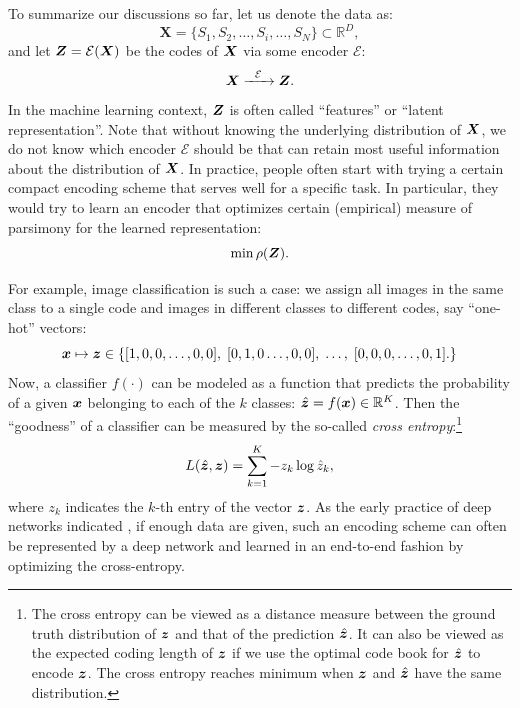 \documentclass[../../book-main.tex]{subfiles}
\begin{document}
\label{sec:consistency}
To summarize our discussions so far, let us denote the data as:
\begin{equation}
    \boldsymbol{X} = \{S_1, S_2, \ldots, S_i, \ldots, S_N\} \subset \mathbb{R}^D,
\end{equation}
and let $\boldsymbol{Z} = \mathcal{E}(\bm{X})$ be the codes of $\bm{X}$ via some encoder $\mathcal{E}$:
\begin{equation}
    \bm{X}  \xrightarrow{\hspace{2mm} \mathcal{E}\hspace{2mm}} \bm{Z}.
    \label{eqn:open-loop}
\end{equation}
In the machine learning context, $\bm{Z}$ is often called ``features'' or ``latent representation''. Note that without knowing the underlying distribution of $\bm{X}$, we do not know which encoder $\mathcal{E}$ should be that can retain most useful information about the distribution of $\bm{X}$. In practice, people often start with trying a certain compact encoding scheme that serves well for a specific task. In particular, they would try to learn an encoder that optimizes certain (empirical) measure of parsimony for the learned representation:
\begin{equation}
    \min \rho(\bm{Z}). 
\end{equation}

\begin{example}
For example, image classification is such a case: we assign all images in the same class to a single code and images in different classes to different codes, say ``one-hot'' vectors:
\begin{equation}
  \bm{x} \mapsto \bm{z} \in \{  [1, 0, 0, \ldots , 0, 0], \;  [0, 1, 0 \ldots, 0, 0], \; \ldots, \;  [0,0,0, \ldots, 0, 1].\}
  \label{eqn:class-labels}
\end{equation}
Now, a classifier $f(\cdot)$ can be modeled as a function that predicts the probability of a given $\bm{x}$ belonging to each of the $k$ classes: $\hat{\bm{z}} = f(\bm{x}) \in \mathbb{R}^K$. Then the ``goodness'' of a classifier can be measured by the so-called {\em cross entropy}:\footnote{The cross entropy can be viewed as a distance measure between the ground truth distribution of $\bm{z}$ and that of the prediction $\hat{\bm{z}}$. It can also be viewed as the expected coding length of $\bm{z}$ if we use the optimal code book for $\hat {\bm{z}}$ to encode $\bm{z}$. The cross entropy reaches minimum when $\bm{z}$ and $\hat {\bm{z}}$ have the same distribution.}
\begin{equation}
    L(\hat{\bm{z}}, \bm{z}) = \sum_{k=1}^K - z_k \log \hat{z}_k,
\end{equation}
where $z_k$ indicates the $k$-th entry of the vector $\bm{z}$. As the early practice of deep networks indicated \cite{krizhevsky2012imagenet}, if enough data are given, such an encoding scheme can often be represented by a deep network and learned in an end-to-end fashion by optimizing the cross-entropy. 
\end{example}
\end{document}
